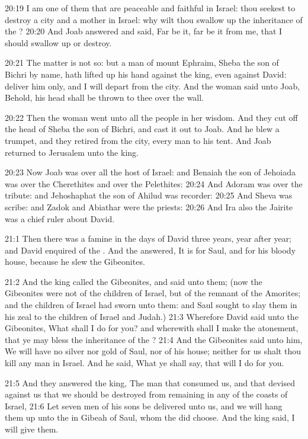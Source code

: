 20:19 I am one of them that are peaceable and faithful in Israel: thou seekest to destroy a city and a mother in Israel: why wilt thou swallow up the inheritance of the \LORD?  20:20 And Joab answered and said, Far be it, far be it from me, that I should swallow up or destroy.

20:21 The matter is not so: but a man of mount Ephraim, Sheba the son of Bichri by name, hath lifted up his hand against the king, even against David: deliver him only, and I will depart from the city. And the woman said unto Joab, Behold, his head shall be thrown to thee over the wall.

20:22 Then the woman went unto all the people in her wisdom. And they cut off the head of Sheba the son of Bichri, and cast it out to Joab.  And he blew a trumpet, and they retired from the city, every man to his tent. And Joab returned to Jerusalem unto the king.

20:23 Now Joab was over all the host of Israel: and Benaiah the son of Jehoiada was over the Cherethites and over the Pelethites: 20:24 And Adoram was over the tribute: and Jehoshaphat the son of Ahilud was recorder: 20:25 And Sheva was scribe: and Zadok and Abiathar were the priests: 20:26 And Ira also the Jairite was a chief ruler about David.

21:1 Then there was a famine in the days of David three years, year after year; and David enquired of the \LORD. And the \LORD answered, It is for Saul, and for his bloody house, because he slew the Gibeonites.

21:2 And the king called the Gibeonites, and said unto them; (now the Gibeonites were not of the children of Israel, but of the remnant of the Amorites; and the children of Israel had sworn unto them: and Saul sought to slay them in his zeal to the children of Israel and Judah.)  21:3 Wherefore David said unto the Gibeonites, What shall I do for you?  and wherewith shall I make the atonement, that ye may bless the inheritance of the \LORD?  21:4 And the Gibeonites said unto him, We will have no silver nor gold of Saul, nor of his house; neither for us shalt thou kill any man in Israel. And he said, What ye shall say, that will I do for you.

21:5 And they answered the king, The man that consumed us, and that devised against us that we should be destroyed from remaining in any of the coasts of Israel, 21:6 Let seven men of his sons be delivered unto us, and we will hang them up unto the \LORD in Gibeah of Saul, whom the \LORD did choose. And the king said, I will give them.

